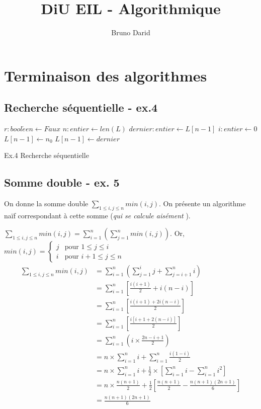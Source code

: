 \documentclass{article}
\title{DiU EIL - Algorithmique}
\author{Bruno Darid}
\begin{document}
\maketitle
\section{Terminaison des algorithmes}
\subsection*{Recherche séquentielle - ex.4}
\begin{algorithm}[H]
\DontPrintSemicolon

  $r: bool\acute{e}en \gets Faux$\;
  $n: entier \gets len(L)$\;
  $dernier: entier \gets L[n-1]$\;
  $i: entier \gets 0$\;
  $L[n-1] \gets n_0 $ 
  $L[n-1] \gets dernier$\;

\caption{Ex.4 Recherche séquentielle}
\end{algorithm}

\subsection*{Somme double - ex. 5}
On donne la somme double $\sum\limits_{1\le i,j\le n} min(i,j)$. On présente un algorithme naïf
correspondant à cette somme (\textit{qui se calcule aisément} ).

$\sum\limits_{1\le i,j\le n}min(i,j) = \sum\limits_{i=1}^{n}\left(\sum\limits_{j=1}^{n}min(i,j)\right)$.
Or,
$
min(i,j)=\left\{ 
	\begin{array}{ll}
		j & \mbox{pour } 1\le j\le i\\
		i & \mbox{pour } i+1\le j\le n
	\end{array}
\right.
$
\begin{align*}
\sum\limits_{1\le i,j\le n}min(i,j) &= \sum\limits_{i=1}^{n}\left(\sum\limits_{j=1}^{i}j +\sum\limits_{j=i+1}^{n}i\right)\\
&= \sum\limits_{i=1}^{n}\left[\frac{i(i+1)}{2} + i(n-i)\right]\\
&= \sum\limits_{i=1}^{n}\left[\frac{i(i+1)+2i(n-i)}{2}\right] \\
&= \sum\limits_{i=1}^{n}\left[ \frac{i[i+1+2(n-i)]}{2} \right] \\
&= \sum\limits_{i=1}^{n}\left(i\times\frac{2n-i+1}{2}\right)\\
&= n\times\sum\limits_{i=1}^{n}i + \sum\limits_{i=1}^{n}\frac{i(1-i)}{2}\\
&= n\times\sum\limits_{i=1}^{n}i + \frac{1}{2}\times \left[\sum\limits_{i=1}^{n}i
											-\sum\limits_{i=1}^{n}i^{2}\right]\\
&= n\times\frac{n(n+1)}{2} + \frac{1}{2}\left[\frac{n(n+1)}{2}-\frac{n(n+1)(2n+1)}{6}\right]\\
&= \frac{n(n+1)(2n+1)}{6}
\end{align*}
\end{document}
